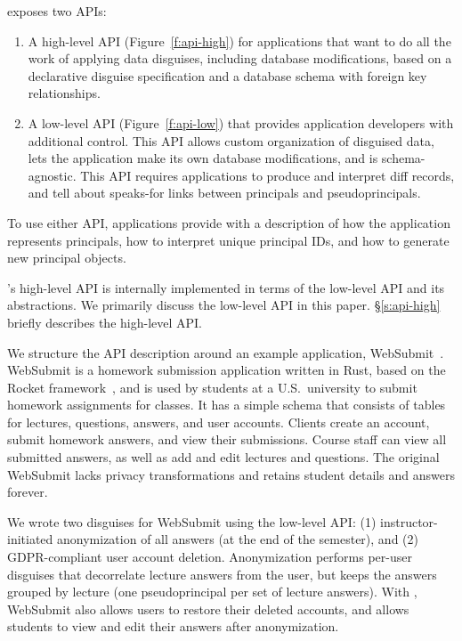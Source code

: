\sys exposes two APIs:
\begin{enumerate}[nosep]
 \item A high-level API (Figure~\ref{f:api-high}) for applications that want \sys to do
   all the work of applying data disguises, including database modifications, based on
   a declarative disguise specification and a database schema with foreign key
   relationships.
 \item A low-level API (Figure~\ref{f:api-low}) that provides application developers with
   additional control. This API allows custom organization of disguised data, lets the application
        make its own database modifications, and is schema-agnostic. This API requires applications
        to produce and interpret diff records, and tell \sys about speaks-for links between
        principals and pseudoprincipals. 
\end{enumerate}
%
To use either API, applications provide \sys with a description of how the application represents
principals, how to interpret unique principal IDs, and how to
generate new principal objects.
%

%
\sys's high-level API is internally implemented in terms of the low-level API and its
abstractions. We primarily discuss the low-level API in this paper.
%
\S\ref{s:api-high} briefly describes the high-level API.
%

%
We structure the API description around an example application, WebSubmit~\cite{websubmit-rs-anon}.
%
WebSubmit is a homework submission application written in Rust, based on the Rocket
framework~\cite{rocket-rs}, and is used by students at a U.S.\ university to submit homework assignments for classes.
%
It has a simple schema that consists of tables for lectures, questions, answers,
and user accounts.
%
Clients create an account, submit homework answers, and view their submissions.
%
Course staff can view all submitted answers, as well as add and edit lectures and
questions.
%
The original WebSubmit lacks privacy transformations and retains student
details and answers forever.
%

%
We wrote two disguises for WebSubmit using the low-level API: (1) instructor-initiated anonymization
of all answers (\eg at the end of the semester), and (2) GDPR-compliant user account deletion.
%
Anonymization performs per-user disguises that decorrelate lecture answers from the user, but keeps
the answers grouped by lecture (\ie one pseudoprincipal per set of lecture answers).
%
With \sys, WebSubmit also allows users to restore their deleted accounts, and allows students to
view and edit their answers after anonymization.

